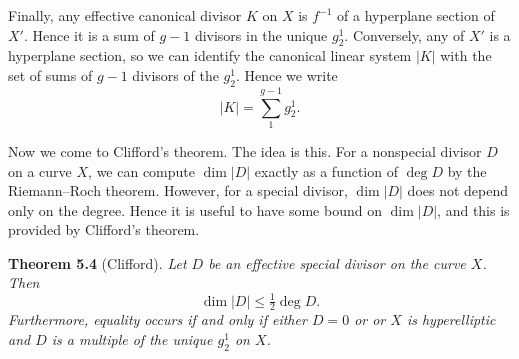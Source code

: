 {Finally, any effective canonical divisor $K$ on $X$ is $f^{-1}$ of a hyperplane section of $X'$. Hence it is a sum of $g-1$ divisors in the unique $g_2^1$. Conversely, any  of $X'$ is a hyperplane section, so we can identify the canonical linear system $|K|$ with the set of sums of $g-1$ divisors of the $g_2^1$. Hence we write
\[
|K|=\sum_1^{g-1}g_2^1.
\]

Now we come to Clifford's theorem. The idea is this. For a nonspecial divisor $D$ on a curve $X$, we can compute $\dim|D|$ exactly as a function of $\deg D$ by the Riemann--Roch theorem. However, for a special divisor, $\dim|D|$ does not depend only on the degree. Hence it is useful to have some bound on $\dim|D|$, and this is provided by Clifford's theorem.

\medskip
\noindent\hypertarget{result-IV-5.4}{}\textbf{Theorem 5.4} (Clifford). \emph{Let $D$ be an effective special divisor on the curve $X$. Then}
\[
\dim|D|\le\tfrac12\deg D.
\]
\emph{Furthermore, equality occurs if and only if either $D=0$ or  or $X$ is hyperelliptic and $D$ is a multiple of the unique $g_2^1$ on $X$.}}

